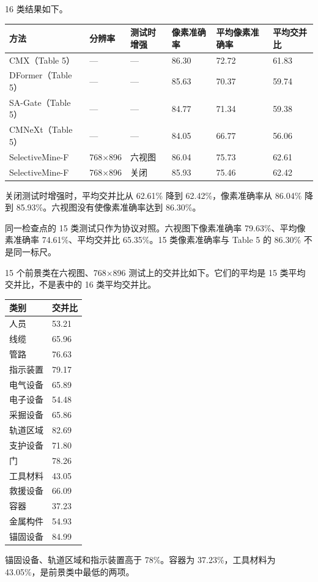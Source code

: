 \documentclass[UTF8,a4paper,11pt]{ctexart}
\begin{document}
16 类结果如下。

\begin{center}\small
\begin{tabular}{|p{2.47cm}|p{2.47cm}|p{2.47cm}|p{2.47cm}|p{2.47cm}|p{2.47cm}|}
\hline
方法 & 分辨率 & 测试时增强 & 像素准确率 & 平均像素准确率 & 平均交并比 \\ \hline
CMX（Table 5） & — & — & 86.30 & 72.72 & 61.83 \\ \hline
DFormer（Table 5） & — & — & 85.63 & 70.37 & 59.74 \\ \hline
SA-Gate（Table 5） & — & — & 84.77 & 71.34 & 59.38 \\ \hline
CMNeXt（Table 5） & — & — & 84.05 & 66.77 & 56.06 \\ \hline
SelectiveMine-F & 768×896 & 六视图 & 86.04 & 75.73 & 62.61 \\ \hline
SelectiveMine-F & 768×896 & 关闭 & 85.93 & 75.46 & 62.42 \\ \hline
\end{tabular}
\end{center}
关闭测试时增强时，平均交并比从 62.61\% 降到 62.42\%，像素准确率从 86.04\% 降到 85.93\%。六视图没有使像素准确率达到 86.30\%。

同一检查点的 15 类测试只作为协议对照。六视图下像素准确率 79.63\%、平均像素准确率 74.61\%、平均交并比 65.35\%。15 类像素准确率与 Table 5 的 86.30\% 不是同一标尺。

15 个前景类在六视图、768×896 测试上的交并比如下。它们的平均是 15 类平均交并比，不是表中的 16 类平均交并比。

\begin{center}\small
\begin{tabular}{|p{7.80cm}|p{7.80cm}|}
\hline
类别 & 交并比 \\ \hline
人员 & 53.21 \\ \hline
线缆 & 65.96 \\ \hline
管路 & 76.63 \\ \hline
指示装置 & 79.17 \\ \hline
电气设备 & 65.89 \\ \hline
电子设备 & 54.48 \\ \hline
采掘设备 & 65.86 \\ \hline
轨道区域 & 82.69 \\ \hline
支护设备 & 71.80 \\ \hline
门 & 78.26 \\ \hline
工具材料 & 43.05 \\ \hline
救援设备 & 66.09 \\ \hline
容器 & 37.23 \\ \hline
金属构件 & 54.93 \\ \hline
锚固设备 & 84.99 \\ \hline
\end{tabular}
\end{center}
锚固设备、轨道区域和指示装置高于 78\%。容器为 37.23\%，工具材料为 43.05\%，是前景类中最低的两项。
\end{document}
